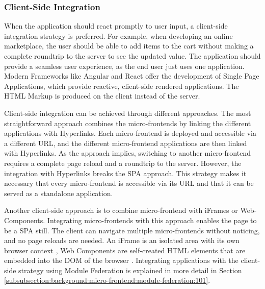 \subsubsection{Client-Side Integration}\label{subsubsection:background:micro-frontend-architecture:integration-strategies:client-side-integration}

When the application should react promptly to user input, a client-side integration strategy is preferred. For example, when developing an online marketplace, the user should be able to add items to the cart without making a complete roundtrip to the server to see the updated value. The application should provide a seamless user experience, as the end user just uses one application. Modern Frameworks like Angular and React offer the development of Single Page Applications, which provide reactive, client-side rendered applications. The \ac{HTML} Markup is produced on the client instead of the server. \cite{book:2020:geers:background:micro-frontends:micro-frontends-in-action}

\bigskip

\noindent Client-side integration can be achieved through different approaches. The most straightforward approach combines the micro-frontends by linking the different applications with Hyperlinks. Each micro-frontend is deployed and accessible via a different \ac{URL}, and the different micro-frontend applications are then linked with Hyperlinks. As the approach implies, switching to another micro-frontend requires a complete page reload and a roundtrip to the server. However, the integration with Hyperlinks breaks the \ac{SPA} approach. This strategy makes it necessary that every micro-frontend is accessible via its \ac{URL} and that it can be served as a standalone application.

\bigskip

\noindent Another client-side approach is to combine micro-frontend with iFrames or Web-Components. Integrating micro-frontends with this approach enables the page to be a \ac{SPA} still. The client can navigate multiple micro-frontends without noticing, and no page reloads are needed. An iFrame is an isolated area with its own browser context \cite[35]{book:2020:geers:background:micro-frontends:micro-frontends-in-action}, Web Components are self-created \ac{HTML} elements that are embedded into the DOM of the browser \cite[103]{book:2019:farrell:background:micro-frontends:web-components-in-action}. Integrating applications with the client-side strategy using Module Federation is explained in more detail in Section \ref{subsubsection:background:micro-frontend:module-federation:101}.
